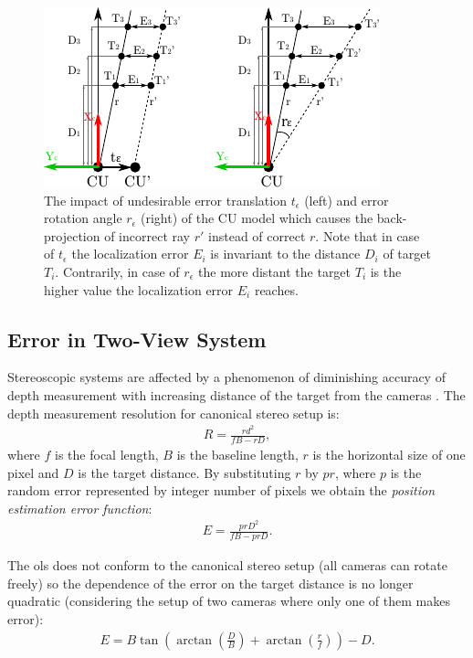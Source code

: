 \begin{figure}[htb]\centering
	\centering
	\includegraphics[width=0.55\linewidth]{fig/rotation_vs_translation.pdf}
	\caption{The impact of undesirable error translation $t_{\epsilon}$ (left) and error rotation angle $r_{\epsilon}$ (right) of the CU model which causes the back-projection of incorrect ray $r'$ instead of correct $r$. Note that in case of $t_{\epsilon}$ the localization error $E_{i}$ is invariant to the distance $D_{i}$ of target $T_{i}$. Contrarily, in case of $r_{\epsilon}$ the more distant the target $T_{i}$ is the higher value the localization error $E_{i}$ reaches.}
	\label{fig:rotation_vs_translation}
\end{figure}

\subsection{Error in Two-View System}

Stereoscopic systems are affected by a phenomenon of diminishing accuracy of depth measurement with increasing distance of the target from the cameras \cite{Cyganek:2007:ICV:1214366}. The depth measurement resolution for canonical stereo setup is:
\begin{align}
R = \frac{rd^{2}}{fB - rD},
\end{align}
where $f$ is the focal length, $B$ is the baseline length, $r$ is the horizontal size of one pixel and $D$ is the target distance. By substituting $r$ by $pr$, where $p$ is the random error represented by integer number of pixels we obtain the \textit{position estimation error function}:
\begin{align}
E = \frac{prD^{2}}{fB - prD}.
\end{align}

The \gls{ols} does not conform to the canonical stereo setup (all cameras can rotate freely) so the dependence of the error on the target distance is no longer quadratic (considering the setup of two cameras where only one of them makes error): 
\begin{align}
E = B\tan(\arctan(\frac{D}{B}) + \arctan(\frac{r}{f})) - D.
\end{align}

